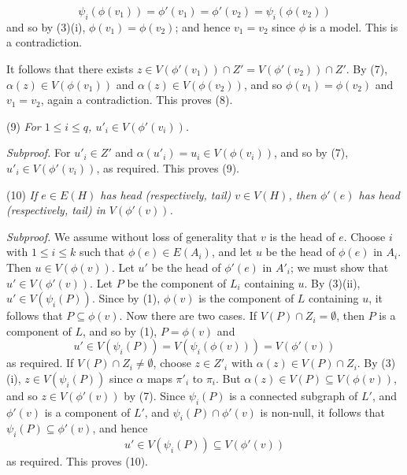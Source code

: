 \begin{equation*}
\psi_i(\phi(v_1)) = \phi'(v_1) = \phi'(v_2) = \psi_i(\phi(v_2))
\end{equation*}
and so by (3)(i), $\phi(v_1) = \phi(v_2)$; and hence $v_1 = v_2$ since $\phi$ is a model. This is a contradiction.

It follows that there exists $z \in V(\phi'(v_1)) \cap Z' = V(\phi'(v_2)) \cap Z'$. By (7), $\alpha(z) \in V(\phi(v_1))$ and $\alpha(z) \in V(\phi(v_2))$, and so $\phi(v_1) = \phi(v_2)$ and $v_1 = v_2$, again a contradiction. This proves (8).

\hspace*{12pt}(9) \textit{For $1 \le i \le q$, $u'_i \in V(\phi'(v_i))$.}

\textit{Subproof.} For $u'_i \in Z'$ and $\alpha(u'_i) = u_i \in V(\phi(v_i))$, and so by (7), $u'_i \in V(\phi'(v_i))$, as required. This proves (9).

\hspace*{12pt}(10) \textit{If $e \in E(H)$ has head (respectively, tail) $v \in V(H)$, then $\phi'(e)$ has head (respectively, tail) in $V(\phi'(v))$.}

\textit{Subproof.} We assume without loss of generality that $v$ is the head of $e$. Choose $i$ with $1 \le i \le k$ such that $\phi(e) \in E(A_i)$, and let $u$ be the head of $\phi(e)$ in $A_i$. Then $u \in V(\phi(v))$. Let $u'$ be the head of $\phi'(e)$ in $A'_i$; we must show that $u' \in V(\phi'(v))$. Let $P$ be the component of $L_i$ containing $u$. By (3)(ii), $u' \in V(\psi_i(P))$. Since by (1), $\phi(v)$ is the component of $L$ containing $u$, it follows that $P \subseteq \phi(v)$. Now there are two cases. If $V(P) \cap Z_i = \emptyset$, then $P$ is a component of $L$, and so by (1), $P = \phi(v)$ and
\begin{equation*}
u' \in V(\psi_i(P)) = V(\psi_i(\phi(v))) = V(\phi'(v))
\end{equation*}
as required. If $V(P) \cap Z_i \ne \emptyset$, choose $z \in Z'_i$ with $\alpha(z) \in V(P) \cap Z_i$. By (3)(i), $z \in V(\psi_i(P))$ since $\alpha$ maps $\pi'_i$ to $\pi_i$. But $\alpha(z) \in V(P) \subseteq V(\phi(v))$, and so $z \in V(\phi'(v))$ by (7). Since $\psi_i(P)$ is a connected subgraph of $L'$, and $\phi'(v)$ is a component of $L'$, and $\psi_i(P) \cap \phi'(v)$ is non-null, it follows that $\psi_i(P) \subseteq \phi'(v)$, and hence
\begin{equation*}
u' \in V(\psi_i(P)) \subseteq V(\phi'(v))
\end{equation*}
as required. This proves (10).

